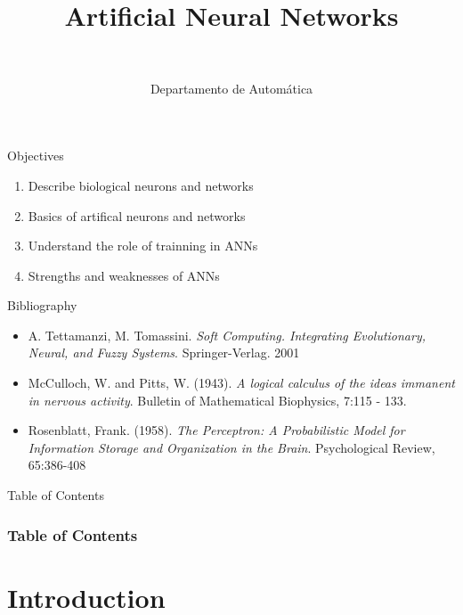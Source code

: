 \documentclass[10pt,compress]{beamer} %
\title[Aritificial Neural Networks]{Artificial Neural Networks}
\author{\asignatura\\\carrera}
\institute{}
\date{Departamento de Automática}
\begin{document}
{\titlepageBlue
    \begin{frame}
        \titlepage
    \end{frame}
}

\begin{frame}[plain]{}
   \begin{block}{Objectives}
      \begin{enumerate}
         \item Describe biological neurons and networks
         \item Basics of artifical neurons and networks
         \item Understand the role of trainning in ANNs
         \item Strengths and weaknesses of ANNs
      \end{enumerate} 
   \end{block}

   \begin{block}{Bibliography}
	\begin{itemize}
        \item A. Tettamanzi, M. Tomassini. \textit{Soft Computing. Integrating Evolutionary, Neural, and Fuzzy Systems}. Springer-Verlag. 2001
	    \item McCulloch, W. and Pitts, W. (1943). \textit{A logical calculus of the ideas immanent in nervous activity}. Bulletin of Mathematical Biophysics, 7:115 - 133. 
	    \item Rosenblatt, Frank.  (1958). \textit{The Perceptron: A Probabilistic Model for Information Storage and Organization in the Brain}. Psychological Review, 65:386-408
	\end{itemize}
   \end{block}
\end{frame}

{
\begin{frame}[shrink]{Table of Contents}
 \frametitle{Table of Contents}
 \tableofcontents
\end{frame}
}

\section{Introduction}
\end{document}
